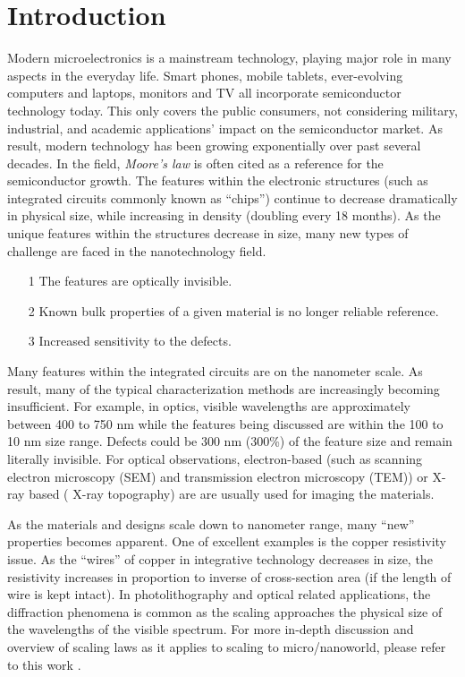 %

\tableofcontents
\listoffigures
\listoftables
\mainmatter
\chapter{Introduction}

Modern microelectronics is a mainstream technology, playing major role in many aspects in the everyday life.  Smart phones, mobile tablets, ever-evolving computers and laptops, monitors and TV all incorporate semiconductor technology today.  This only covers the public consumers, not considering military, industrial, and academic applications' impact on the semiconductor market.  As result, modern technology has been growing exponentially over past several decades.  In the field, \textit{Moore's law} is often cited as a reference for the semiconductor growth.  The features within the electronic structures (such as integrated circuits commonly known as ``chips'') continue to decrease dramatically in physical size, while increasing in density (doubling every 18 months).  As the unique features within the structures decrease in size, many new types of challenge are faced in the nanotechnology field.

{\SingleSpacing
\begin{itemize}
\item[1] The features are optically invisible.
\item[2] Known bulk properties of a given material is no longer reliable reference.
\item[3] Increased sensitivity to the defects.
\end{itemize}
}

Many features within the integrated circuits are on the nanometer scale.  As result, many of the typical characterization methods are increasingly becoming insufficient. For example, in optics,  visible wavelengths are approximately between 400 to 750 nm while the features being discussed are within the 100 to 10 nm size range.  Defects could be 300 nm (300\%) of  the feature size and remain literally invisible.  For optical observations, electron-based (such as scanning electron microscopy (SEM) and transmission electron microscopy (TEM)) or X-ray based ( X-ray topography) are are usually used for imaging the materials.

As the materials and designs scale down to nanometer range, many ``new'' properties becomes apparent.  One of excellent examples is the copper resistivity issue.  As the ``wires'' of copper in integrative technology decreases in size, the resistivity increases in proportion to inverse of cross-section area (if the length of wire is kept intact).  In photolithography and optical related applications, the diffraction phenomena is common as the scaling approaches the physical size of the wavelengths of the visible spectrum.  For more in-depth discussion and overview of scaling laws as it applies to scaling to micro/nanoworld, please refer to this work \cite{Wautelet1}.

